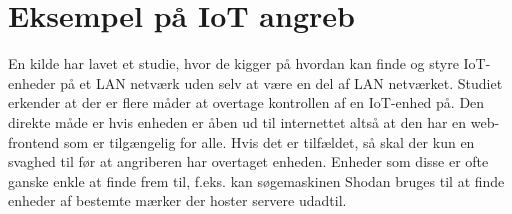 \section{Eksempel på IoT angreb}
En kilde \autocite{UCBerkeley} har lavet et studie, hvor de kigger på hvordan kan finde og styre IoT-enheder på et LAN netværk uden selv at være en del af LAN netværket. Studiet erkender at der er flere måder at overtage kontrollen af en IoT-enhed på. Den direkte måde er hvis enheden er åben ud til internettet altså at den har en web-frontend som er tilgængelig for alle. Hvis det er tilfældet, så skal der kun en svaghed til før at angriberen har overtaget enheden. Enheder som disse er ofte ganske enkle at finde frem til, f.eks. kan søgemaskinen Shodan bruges til at finde enheder af bestemte mærker der hoster servere udadtil.\\

